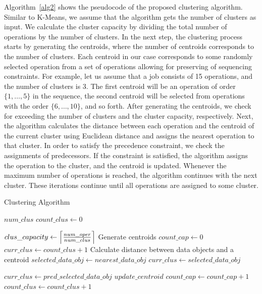 \documentclass[runningheads]{llncs}
\DeclarePairedDelimiter\ceil{\lceil}{\rceil}
\begin{document}
Algorithm~\ref{alg2} shows the pseudocode of the proposed clustering algorithm. Similar to K-Means, we assume that the algorithm gets the number of clusters as input. We calculate the cluster capacity by dividing the total number of operations by the number of clusters. In the next step, the clustering process starts by generating the centroids, where the number of centroids corresponds to the number of clusters. Each centroid in our case corresponds to some randomly selected operation from a set of operations allowing for preserving of sequencing constraints. For example, let us assume that a job consists of 15 operations, and the number of clusters is $3$. The first centroid will be an operation of order $\{1, \dots, 5\}$ in the sequence, the second centroid will be selected from operations with the order $\{6, \dots, 10\}$, and so forth. After generating the centroids, we check for exceeding the number of clusters and the cluster capacity, respectively. 
%
Next, the algorithm calculates the distance between each operation and the centroid of the current cluster using Euclidean distance and assigns the nearest operation to that cluster. In order to satisfy the precedence constraint, we check the assignments of predecessors. If the constraint is satisfied, the algorithm assigns the operation to the cluster, and the centroid is updated. Whenever the maximum number of operations is reached, the algorithm continues with the next cluster. These iterations continue until all operations are assigned to some cluster. 

\begin{algorithm}
\caption{Clustering Algorithm}\label{alg2}
\begin{algorithmic}
\Require $num\_clus$
\State $count\_clus \gets 0$

\State $clus\_capacity \gets \ceil*{\frac{num\_oper}{num\_clus}}$
\State Generate centroids
    \State $count\_cap \gets 0$
    \State $curr\_clus \gets count\_clus + 1$
          \State Calculate distance between data objects and a centroid   
          \State $selected\_data\_obj \gets nearest\_data\_obj$
          \State $curr\_clus \gets selected\_data\_obj$    

               
              \State $curr\_clus \gets pred\_selected\_data\_obj$
          \EndIf
          \State $update\_centroid$
          \State $count\_cap \gets count\_cap + 1 $
	\EndWhile
    \State $count\_clus \gets count\_clus + 1 $
\EndWhile
\end{algorithmic}
\end{algorithm}
\end{document}
